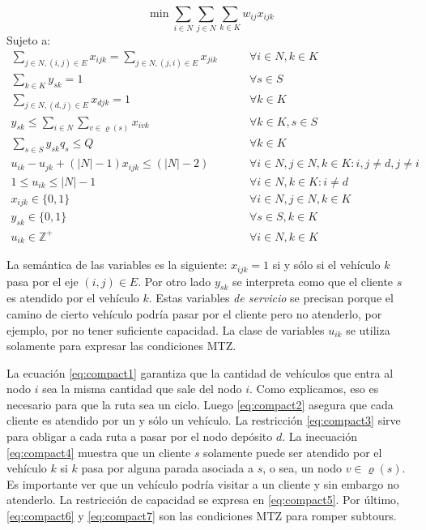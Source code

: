 \begin{equation}
    \min \sum_{i \in N} \sum_{j \in N} \sum_{k \in K} w_{ij} x_{ijk}
\end{equation}
Sujeto a:
\begin{align}
    \sum_{j \in N, (i, j) \in E}{x_{ijk}} = \sum_{j \in N, (j, i) \in E}{x_{jik}} \qquad & \forall {i \in N, k \in K} \label{eq:compact1} \\
    \sum_{k \in K} y_{sk} = 1 \qquad & \forall {s \in S} \label{eq:compact2} \\
    \sum_{j \in N, (d, j) \in E}{x_{djk}} = 1 \qquad & \forall {k \in K} \label{eq:compact3} \\ 
    y_{sk} \leq \sum_{i \in N}\sum_{v \in \varrho(s)}{x_{ivk}} \qquad & \forall {k \in K, s \in S} \label{eq:compact4} \\
    \sum_{s \in S}{y_{sk}q_s} \le Q \qquad & \forall {k \in K} \label{eq:compact5} \\
u_{ik} - u_{jk} + (|N| - 1)x_{ijk} \leq (|N| - 2)  \qquad & \forall {i \in N, j \in N, k \in K: i,j \neq d, j \neq i} \label{eq:compact6} \\
1 \leq u_{ik} \leq |N| - 1  \qquad & \forall {i \in N, k \in K: i \neq d} \label{eq:compact7} \\
x_{ijk} \in \{0, 1\} \qquad & \forall {i \in N, j \in N, k \in K} \label{eq:compact8} \\
y_{sk} \in \{0, 1\} \qquad & \forall {s \in S, k \in K} \label{eq:compact9}\\
u_{ik} \in \mathbb{Z}^{+} \qquad & \forall {i \in N, k \in K} \label{eq:compact10}
\end{align}

La semántica de las variables es la siguiente: $x_{ijk} = 1$ si y sólo si el vehículo $k$ pasa por el eje $(i, j) \in E$. Por otro lado $y_{sk}$ se interpreta como que el cliente $s$ es atendido por el vehículo $k$. Estas variables \emph{de servicio} se precisan porque el camino de cierto vehículo podría pasar por el cliente pero no atenderlo, por ejemplo, por no tener suficiente capacidad. La clase de variables $u_{ik}$ se utiliza solamente para expresar las condiciones MTZ. 

La ecuación \ref{eq:compact1} garantiza que la cantidad de vehículos que entra al nodo $i$ sea la misma cantidad que sale del nodo $i$. Como explicamos, eso es necesario para que la ruta sea un ciclo. Luego \ref{eq:compact2} asegura que cada cliente es atendido por un y sólo un vehículo. La restricción \ref{eq:compact3} sirve para obligar a cada ruta a pasar por el nodo depósito $d$. La inecuación \ref{eq:compact4} muestra que un cliente $s$ solamente puede ser atendido por el vehículo $k$ si $k$ pasa por alguna parada asociada a $s$, o sea, un nodo $v \in \varrho(s)$. Es importante ver que un vehículo podría visitar a un cliente y sin embargo no atenderlo. La restricción de capacidad se expresa en \ref{eq:compact5}. Por último, \ref{eq:compact6} y \ref{eq:compact7} son las condiciones MTZ para romper subtours.

